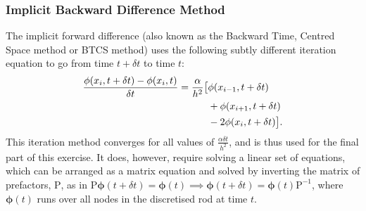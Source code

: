 \subsubsection{Implicit Backward Difference Method}
The implicit forward difference (also known as the Backward Time, Centred Space method or BTCS method) uses the following subtly different iteration equation to go from time $t+\delta t$ to time $t$:
\begin{align}
    \frac{\phi(x_i,t+\delta t) - \phi(x_i,t)}{\delta t} = \frac{\alpha}{h^2}\big[&\phi(x_{i-1},t+\delta t) \notag \\
                                                                                 & + \phi(x_{i+1},t+\delta t) \label{eqn:implicit} \\
                                                                                 & - 2\phi(x_i,t+\delta t)\big]. \notag
\end{align}
This iteration method converges for all values of $\frac{\alpha \delta t}{h^2}$, and is thus used for the final part of this exercise. It does, however, require solving a linear set of equations, which can be arranged as a matrix equation and solved by inverting the matrix of prefactors, $\text{P}$, as in $\text{P}\bm{\phi}(t+\delta t) = \bm{\phi}(t) \implies \bm{\phi}(t+\delta t) = \bm{\phi}(t) \text{P}^{-1}$, where $\bm{\phi}(t)$ runs over all nodes in the discretised rod at time $t$.